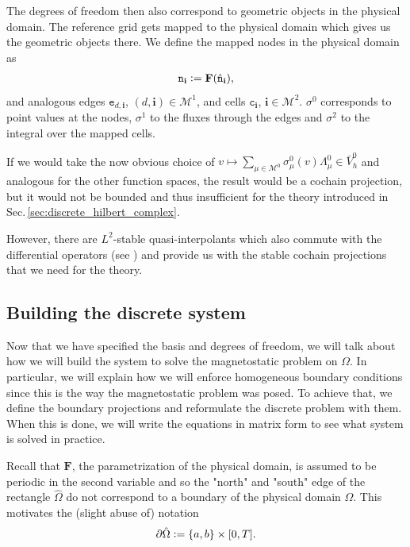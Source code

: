 \documentclass[../master_thesis.tex]{subfiles}
\begin{document}

The degrees of freedom then also correspond to geometric objects in the physical domain. 
The reference grid gets mapped to the physical domain which gives us the geometric objects there.
We define the mapped nodes in the physical domain as 
\begin{align*}
    \mathtt{n}_\mathbf{i} \vcentcolon= \mathbf{F}(\hat{\mathtt{n}}_\mathbf{i}), 
\end{align*}
and analogous edges $\mathtt{e}_{d,\mathbf{i}}$, $(d,\mathbf{i}) \in \mathcal{M}^1$, and 
cells $\mathtt{c}_\mathbf{i}$, $\mathbf{i} \in \mathcal{M}^2$.
$\sigma^0$ corresponds to point values at the nodes,
$\sigma^1$ to the fluxes through the edges and 
$\sigma^2$ to the integral over the mapped cells.

\begin{remark}
    If we would take the now obvious choice of $v \mapsto \sum_{\mu\in \mathcal{M}^0} \sigma^0_\mu(v) \Lambda^0_\mu 
    \in \bar{V}_h^0$ and analogous for the other function spaces,
    the result would be a cochain projection, but it would not be bounded and 
    thus insufficient for the theory introduced in Sec.\,{\ref{sec:discrete_hilbert_complex}}.

    However, there are $L^2$-stable quasi-interpolants which  
    also commute with the differential operators (see \cite[Sec.\,4]{buffa_rivas_sangalli}) and provide us 
    with the stable cochain projections that we need for the theory.
\end{remark}

\subsection{Building the discrete system}\label{sec:assembling_the_discrete_system}

Now that we have specified the basis and degrees of freedom, we will talk about 
how we will build the system to solve the magnetostatic problem on $\Omega$. 
In particular, we will explain how we will enforce homogeneous boundary conditions since 
this is the way the magnetostatic problem was posed. To achieve that, we 
define the boundary projections and reformulate the discrete problem with them.
When this is done, we will write the equations in matrix form to see 
what system is solved in practice. 

Recall that $\mathbf{F}$, the parametrization of the physical domain, is assumed to 
be periodic in the second variable and so the "north" and "south" edge of the 
rectangle $\hat{\Omega}$ do not correspond to a boundary of the physical domain 
$\Omega$. This motivates the 
(slight abuse of) notation 
\begin{align*}
    \partial \hat{\Omega} \vcentcolon= \{a,b\} \times [0,T].
\end{align*}
\end{document}
